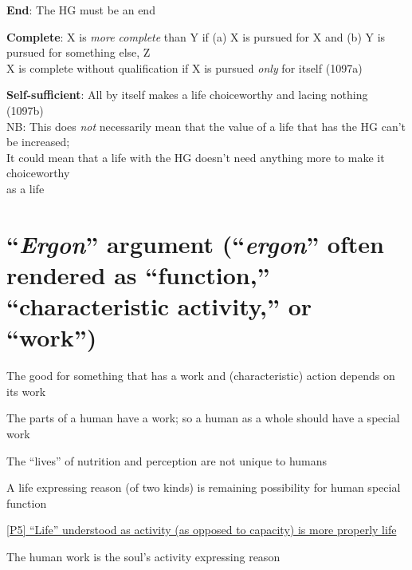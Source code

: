 \documentclass[11pt]{article}
\begin{document}
\noindent [B] \textbf{End}: The HG must be an end
\vspace*{1mm}

\noindent [C] \textbf{Complete}: X is \emph{more complete} than Y if (a) X is pursued for X and (b) Y is pursued for something else, Z\\\hspace*{24mm}X is complete without qualification if X is pursued \emph{only} for itself (1097a)
\vspace*{1mm}

\noindent [D] \textbf{Self-sufficient}: All by itself makes a life choiceworthy and lacing nothing (1097b)\\\hspace*{26mm}NB: This does \emph{not} necessarily mean that the value of a life that has the HG can't be increased;\\\hspace*{26mm} It could mean that a life with the HG doesn't need anything more to make it choiceworthy\\\hspace*{26mm} as a life
\vspace*{2mm}

\section*{``\emph{Ergon}'' argument (``\emph{ergon}'' often rendered as ``function,'' ``characteristic activity,'' or ``work'')}

\noindent [P1] The good for something that has a work and (characteristic) action depends on its work
\vspace*{1mm}

\noindent [P2] The parts of a human have a work; so a human as a whole should have a special work
\vspace*{1mm}

\noindent [P3] The ``lives'' of nutrition and perception are not unique to humans
\vspace*{1mm}

\noindent [P4] A life expressing reason (of two kinds) is remaining possibility for human special function
\vspace*{1mm}

\noindent \underline{[P5] ``Life'' understood as activity (as opposed to capacity) is more properly life}
\vspace*{1mm}

\noindent [C1] The human work is the soul's activity expressing reason
\vspace*{3mm}
\end{document}
